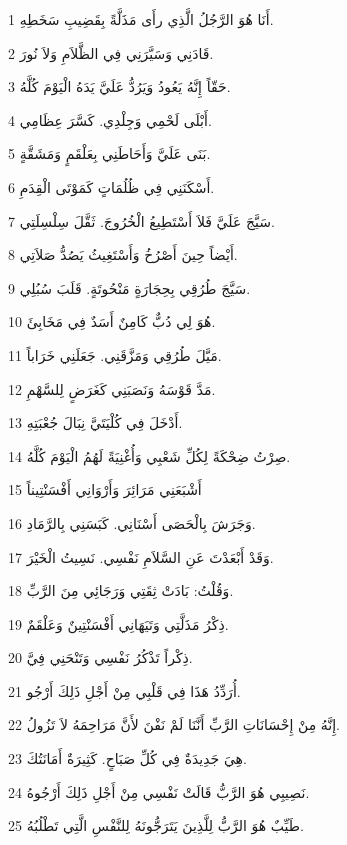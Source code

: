 \par 1 أَنَا هُوَ الرَّجُلُ الَّذِي رأَى مَذَلَّةً بِقَضِيبِ سَخَطِهِ.
\par 2 قَادَنِي وَسَيَّرَنِي فِي الظَّلاَمِ وَلاَ نُورَ.
\par 3 حَقّاً إِنَّهُ يَعُودُ وَيَرُدُّ عَلَيَّ يَدَهُ الْيَوْمَ كُلَّهُ.
\par 4 أَبْلَى لَحْمِي وَجِلْدِي. كَسَّرَ عِظَامِي.
\par 5 بَنَى عَلَيَّ وَأَحَاطَنِي بِعَلْقَمٍ وَمَشَقَّةٍ.
\par 6 أَسْكَنَنِي فِي ظُلُمَاتٍ كَمَوْتَى الْقِدَمِ.
\par 7 سَيَّجَ عَلَيَّ فَلاَ أَسْتَطِيعُ الْخُرُوجَ. ثَقَّلَ سِلْسِلَتِي.
\par 8 أَيْضاً حِينَ أَصْرُخُ وَأَسْتَغِيثُ يَصُدُّ صَلاَتِي.
\par 9 سَيَّجَ طُرُقِي بِحِجَارَةٍ مَنْحُوتَةٍ. قَلَبَ سُبُلِي.
\par 10 هُوَ لِي دُبٌّ كَامِنٌ أَسَدٌ فِي مَخَابِئَ.
\par 11 مَيَّلَ طُرُقِي وَمَزَّقَنِي. جَعَلَنِي خَرَاباً.
\par 12 مَدَّ قَوْسَهُ وَنَصَبَنِي كَغَرَضٍ لِلسَّهْمِ.
\par 13 أَدْخَلَ فِي كُلْيَتَيَّ نِبَالَ جُعْبَتِهِ.
\par 14 صِرْتُ ضِحْكَةً لِكُلِّ شَعْبِي وَأُغْنِيَةً لَهُمُ الْيَوْمَ كُلَّهُ.
\par 15 أَشْبَعَنِي مَرَائِرَ وَأَرْوَانِي أَفْسَنْتِيناً
\par 16 وَجَرَشَ بِالْحَصَى أَسْنَانِي. كَبَسَنِي بِالرَّمَادِ.
\par 17 وَقَدْ أَبْعَدْتَ عَنِ السَّلاَمِ نَفْسِي. نَسِيتُ الْخَيْرَ.
\par 18 وَقُلْتُ: بَادَتْ ثِقَتِي وَرَجَائِي مِنَ الرَّبِّ.
\par 19 ذِكْرُ مَذَلَّتِي وَتَيَهَانِي أَفْسَنْتِينٌ وَعَلْقَمٌ.
\par 20 ذِكْراً تَذْكُرُ نَفْسِي وَتَنْحَنِي فِيَّ.
\par 21 أُرَدِّدُ هَذَا فِي قَلْبِي مِنْ أَجْلِ ذَلِكَ أَرْجُو.
\par 22 إِنَّهُ مِنْ إِحْسَانَاتِ الرَّبِّ أَنَّنَا لَمْ نَفْنَ لأَنَّ مَرَاحِمَهُ لاَ تَزُولُ.
\par 23 هِيَ جَدِيدَةٌ فِي كُلِّ صَبَاحٍ. كَثِيرَةٌ أَمَانَتُكَ.
\par 24 نَصِيبِي هُوَ الرَّبُّ قَالَتْ نَفْسِي مِنْ أَجْلِ ذَلِكَ أَرْجُوهُ.
\par 25 طَيِّبٌ هُوَ الرَّبُّ لِلَّذِينَ يَتَرَجُّونَهُ لِلنَّفْسِ الَّتِي تَطْلُبُهُ.
